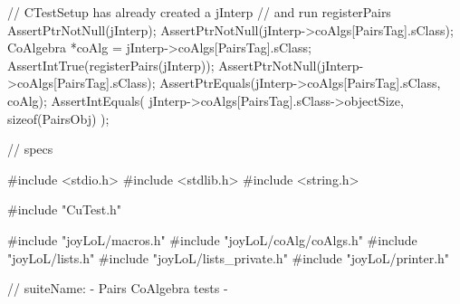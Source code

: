 
\startCTest
  // CTestSetup has already created a jInterp
  // and run registerPairs
  AssertPtrNotNull(jInterp);
  AssertPtrNotNull(jInterp->coAlgs[PairsTag].sClass);
  CoAlgebra *coAlg = jInterp->coAlgs[PairsTag].sClass;
  AssertIntTrue(registerPairs(jInterp));
  AssertPtrNotNull(jInterp->coAlgs[PairsTag].sClass);
  AssertPtrEquals(jInterp->coAlgs[PairsTag].sClass, coAlg);
  AssertIntEquals(
    jInterp->coAlgs[PairsTag].sClass->objectSize,
    sizeof(PairsObj)
  );
\stopCTest
\stopTestCase
\stopTestSuite


\starttyping
// specs

#include <stdio.h>
#include <stdlib.h>
#include <string.h>

#include "CuTest.h"

#include "joyLoL/macros.h"
#include "joyLoL/coAlg/coAlgs.h"
#include "joyLoL/lists.h"
#include "joyLoL/lists_private.h"
#include "joyLoL/printer.h"

// suiteName: - Pairs CoAlgebra tests -


\stoptyping
